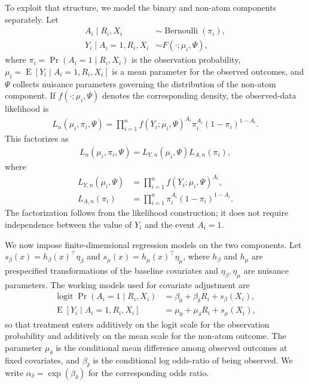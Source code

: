 \documentclass[11pt]{article}
\DeclareMathOperator*{\E}{E}
\DeclareMathOperator*{\logit}{logit}
\DeclareMathOperator*{\Bernoulli}{Bernoulli}
\begin{document}
To exploit that structure, we model the binary and non-atom components separately. Let
\begin{align*}
  A_i \mid R_i, X_i &\sim \Bernoulli\left(\pi_i\right),\\
  Y_i \mid A_i = 1, R_i, X_i &\sim F\left(\cdot; \mu_i, \Psi\right),
\end{align*}
where $\pi_i = \Pr(A_i = 1 \mid R_i, X_i)$ is the observation probability, $\mu_i = \E[Y_i \mid A_i = 1, R_i, X_i]$ is a mean parameter for the observed outcomes, and $\Psi$ collects nuisance parameters governing the distribution of the non-atom component. If $f(\cdot; \mu_i, \Psi)$ denotes the corresponding density, the observed-data likelihood is
\begin{align*}
  L_n(\mu_i, \pi_i, \Psi)
  = \prod_{i = 1}^n
    f\left(Y_i; \mu_i, \Psi\right)^{A_i}
    \pi_i^{A_i}
    \left(1 - \pi_i\right)^{1 - A_i}.
\end{align*}
This factorizes as
\begin{align*}
  L_n(\mu_i, \pi_i, \Psi)
  = L_{Y,n}(\mu_i, \Psi)L_{A,n}(\pi_i),
\end{align*}
where
\begin{align*}
  L_{Y,n}(\mu_i, \Psi)
  &= \prod_{i = 1}^n f\left(Y_i; \mu_i, \Psi\right)^{A_i},\\
  L_{A,n}(\pi_i)
  &= \prod_{i = 1}^n \pi_i^{A_i}\left(1 - \pi_i\right)^{1 - A_i}.
\end{align*}
The factorization follows from the likelihood construction; it does not require independence between the value of $Y_i$ and the event $A_i = 1$.

We now impose finite-dimensional regression models on the two components. Let $s_\beta(x) = h_\beta(x)^\top\eta_\beta$ and $s_\mu(x) = h_\mu(x)^\top\eta_\mu$, where $h_\beta$ and $h_\mu$ are prespecified transformations of the baseline covariates and $\eta_\beta,\eta_\mu$ are nuisance parameters. The working models used for covariate adjustment are
\begin{align}
  \logit \Pr(A_i = 1 \mid R_i, X_i)
  &= \beta_0 + \beta_\delta R_i + s_\beta(X_i),\label{eq:glm1}\\
  \E[Y_i \mid A_i = 1, R_i, X_i]
  &= \mu_0 + \mu_\delta R_i + s_\mu(X_i),\label{eq:glm2}
\end{align}
so that treatment enters additively on the logit scale for the observation probability and additively on the mean scale for the non-atom outcome. The parameter $\mu_\delta$ is the conditional mean difference among observed outcomes at fixed covariates, and $\beta_\delta$ is the conditional log odds-ratio of being observed. We write $\alpha_\delta = \exp(\beta_\delta)$ for the corresponding odds ratio.
\end{document}
